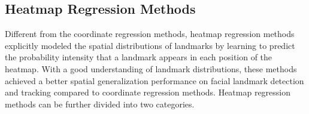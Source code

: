 \documentclass[review]{elsarticle}
\begin{document}



\subsection{Heatmap Regression Methods}
\label{relate_heat}
Different from the coordinate regression methods, heatmap regression methods explicitly modeled the spatial distributions of landmarks by learning to predict the probability intensity that a landmark appears in each position of the heatmap. With a good understanding of landmark distributions, these methods achieved a better spatial generalization performance on facial landmark detection \cite{hourglass, how_far, HRnet, CascadedTransformers, RePFormer,AOHR, HybridMatch} and tracking \cite{encoder_decoder,AOHR,tai2018towards} compared to coordinate regression methods. Heatmap regression methods can be further divided into two categories.
\end{document}
